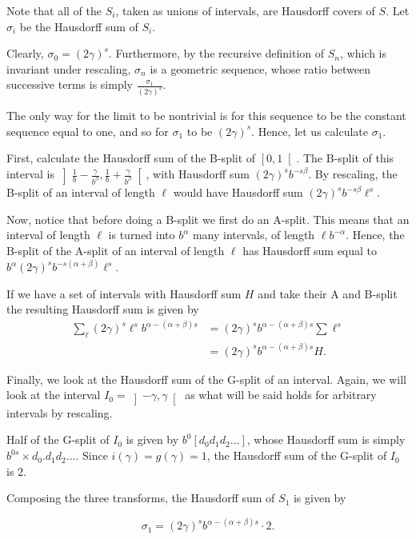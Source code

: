 \documentclass[11pt, reqno]{amsart}
\begin{document}
Note that all of the $S_i$, taken as unions of intervals, are Hausdorff covers of $S$. Let $\sigma_i$ be the Hausdorff sum of $S_i$.

Clearly, $\sigma_0 = (2 \gamma)^s$. Furthermore, by the recursive definition of $S_n$, which is invariant under rescaling, $\sigma_n$ is a geometric sequence, whose ratio between successive terms is simply $\frac{\sigma_1}{(2 \gamma)^s}$.

The only way for the limit to be nontrivial is for this sequence to be the constant sequence equal to one, and so for $\sigma_1$ to be $(2 \gamma)^s$. Hence, let us calculate $\sigma_1$.

First, calculate the Hausdorff sum of the B-split of $\left[0, 1 \right[$. The B-split of this interval is $\left] \frac 1 b - \frac \gamma{b^\beta}, \frac 1 b + \frac \gamma{b^\beta} \right[$, with Hausdorff sum $(2 \gamma)^s b^{-s \beta}$. By rescaling, the B-split of an interval of length $\ell$ would have Hausdorff sum $(2 \gamma)^s b^{-s \beta} \ell^s$.

Now, notice that before doing a B-split we first do an A-split. This means that an interval of length $\ell$ is turned into $b^\alpha$ many intervals, of length $\ell b^{-\alpha}$. Hence, the B-split of the A-split of an interval of length $\ell$ has Hausdorff sum equal to $b^\alpha (2 \gamma)^s b^{-s (\alpha + \beta)} \ell^s$.

If we have a set of intervals with Hausdorff sum $H$ and take their A and B-split the resulting Hausdorff sum is given by
\begin{align*}
\sum_\ell (2 \gamma)^s \ell^s b^{\alpha - (\alpha + \beta) s} &=
(2 \gamma)^s b^{\alpha - (\alpha + \beta) s} \sum \ell^s\\
&= (2 \gamma)^s b^{\alpha - (\alpha + \beta) s} H.
\end{align*}

Finally, we look at the Hausdorff sum of the G-split of an interval. Again, we will look at the interval $I_0 = \left] -\gamma, \gamma \right[$ as what will be said holds for arbitrary intervals by rescaling.

Half of the G-split of $I_0$ is given by $b^0 [ d_0 d_1 d_2 \dots]$, whose Hausdorff sum is simply $b^{0s} \times d_0 . d_1 d_2 \dots$. Since $i(\gamma) = g(\gamma) = 1$, the Hausdorff sum of the G-split of $I_0$ is 2.

Composing the three transforms, the Hausdorff sum of $S_1$ is given by

\[\sigma_1 = (2 \gamma)^s b^{\alpha - (\alpha + \beta) s} \cdot 2.\]
\end{document}
